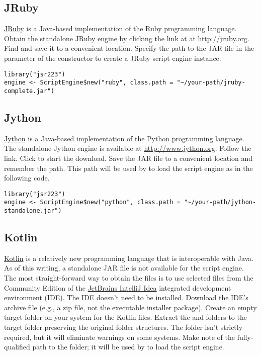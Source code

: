 \subsection{JRuby}

\href{http://jruby.org}{JRuby} is a Java-based implementation of the Ruby programming language. Obtain the standalone JRuby engine by clicking the  link at at \url{http://jruby.org}. Find  and save it to a convenient location. Specify the path to the JAR file in the  parameter of the  constructor to create a JRuby script engine instance.

\begin{verbatim}
library("jsr223")
engine <- ScriptEngine$new("ruby", class.path = "~/your-path/jruby-complete.jar")
\end{verbatim}

\subsection{Jython}

\href{http://www.jython.org}{Jython} is a Java-based implementation of the Python programming language. The standalone Jython engine is available at \url{http://www.jython.org}. Follow the  link. Click  to start the download. Save the JAR file to a convenient location and remember the path. This path will be used by  to load the script engine as in the following code.

\begin{verbatim}
library("jsr223")
engine <- ScriptEngine$new("python", class.path = "~/your-path/jython-standalone.jar")
\end{verbatim}

\hypertarget{kotlinscriptengineinstallation}{\subsection{Kotlin}}

\href{https://kotlinlang.org/}{Kotlin} is a relatively new programming language that is interoperable with Java. As of this writing, a standalone JAR file is not available for the script engine. The most straight-forward way to obtain the files is to use selected files from the Community Edition of the \href{https://www.jetbrains.com/idea/}{JetBrains IntelliJ Idea} integrated development environment (IDE). The IDE doesn't need to be installed. Download the IDE's archive file (e.g., a zip file, not the executable installer package). Create an empty target folder on your system for the Kotlin files. Extract the  and  folders to the target folder preserving the original folder structures.  The  folder isn't strictly required, but it will eliminate warnings on some systems. Make note of the fully-qualified path to the  folder; it will be used by  to load the script engine.

